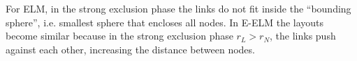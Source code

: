 \documentclass[nofootinbib,preprint,floatfix,titlepage,endfloats]{revtex4} %
\begin{document}
For ELM, %
in the strong exclusion phase the links do not fit inside the ``bounding sphere'', i.e. smallest sphere that encloses all nodes. 
In E-ELM the layouts become similar because in the strong exclusion phase $r_L > r_N$, the links push against each other, increasing the distance between nodes. 
%
% 
\end{document}
